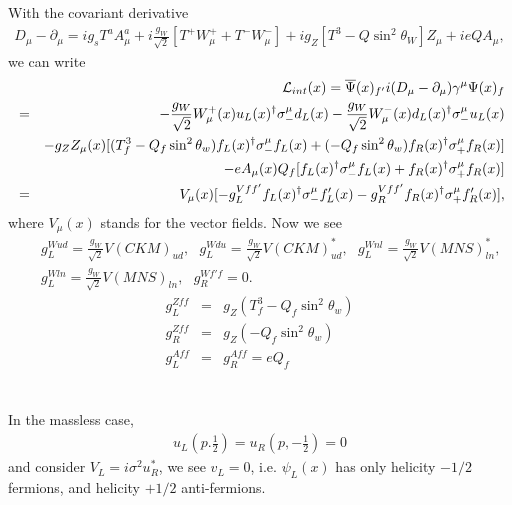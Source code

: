 \documentclass[11pt]{article}
\def\del{{\partial}}
\def\dgr{\dagger}
\begin{document}
\section{ }
With the covariant derivative
\begin{eqnarray}
    D_\mu - \del_\mu=
     i g_s           T^a A^a_\mu
    + i \frac{g_W}{\sqrt 2} [T^+ W^+_\mu  + T^- W^-_\mu]
    + i g_Z [ T^3 - Q \sin^2\theta_W ] Z_\mu
    + i e Q A_\mu,
\end{eqnarray}
we can write
\begin{eqnarray}
    && {\cal L}_{int}(x)
     = {\overline \Psi}(x)_{f'} i(D_\mu -\del_\mu) \gamma^\mu \Psi(x)_f \\ 
     &=& -\frac{g_W}{\sqrt 2} W^+_\mu(x) u_L(x)^\dgr \sigma_-^\mu d_L(x)
     -\frac{g_W}{\sqrt 2} W^-_\mu(x)  d_L(x)^\dgr \sigma_-^\mu u_L(x)
     \nonumber \\&&-g_Z Z_\mu(x) [(T^3_f-Q_f\sin^2\theta_w) f_L(x)^\dgr \sigma_-^\mu f_L(x)  + (-Q_f\sin^2\theta_w) f_R(x)^\dgr \sigma_+^\mu f_R(x) ]
     \nonumber \\ &&  -e A_\mu(x)  Q_f   [ f_L(x)^\dgr \sigma_-^\mu f_L(x)
                                   +f_R(x)^\dgr \sigma_+^\mu f_R(x) ]\\
     &=& V_\mu(x)     [  -g_L^{Vff'} f_L(x)^\dgr \sigma_-^\mu f'_L(x)
                     -g_R^{Vff'} f_R(x)^\dgr \sigma_+^\mu f'_R(x) ],
 \end{eqnarray}
where $V_\mu(x)$ stands for the vector fields.
Now we see
\begin{eqnarray}
    &&g_L^{Wud} = \frac{g_W}{\sqrt 2} V(CKM)_{ud},~~~ g_L^{Wdu} = \frac{g_W}{\sqrt 2} V(CKM)_{ud}^*,~~~ g_L^{Wnl} = \frac{g_W}{\sqrt 2} V(MNS)_{ln}^*,\\
    &&g_L^{Wln} = \frac{g_W}{\sqrt 2} V(MNS)_{ln},~~~ g_R^{Wf'f} = 0.
\end{eqnarray}
\begin{eqnarray}
    g_L^{Zff} &=& g_Z (T^3_f - Q_f \sin^2\theta_w ) \\ 
    g_R^{Zff} &=& g_Z (      - Q_f \sin^2\theta_w ) \\
    g_L^{Aff} &=& g_R^{Aff} = e Q_f 
\end{eqnarray}

\section{ }
In the massless case,
\begin{eqnarray}
    u_L(p.\frac{1}{2})=u_R(p,-\frac{1}{2})=0
\end{eqnarray}
and consider $V_L=i\sigma^2u_R^*$, we see $v_L=0$, i.e. $\psi_L(x)$ has only helicity $-1/2$ fermions, and helicity $+1/2$ anti-fermions. 
\end{document}

